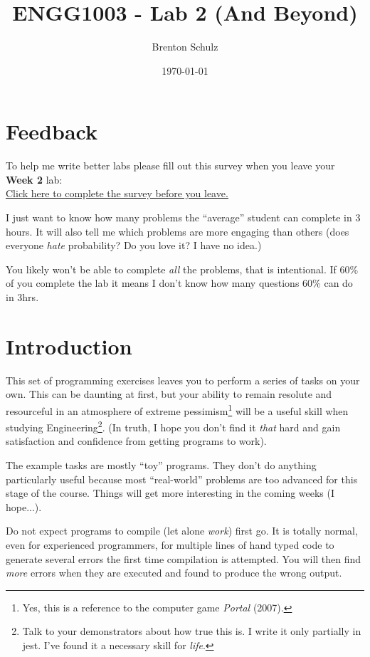 \documentclass{lab}
\title{ENGG1003 - Lab 2 (And Beyond)}
\author{Brenton Schulz}
\date{\today}
\begin{document}
\maketitle

\section{Feedback}

To help me write better labs please fill out this survey when you leave your \textbf{Week 2} lab:
\vspace{5mm} \\ 
\huge{\underline{\href{https://docs.google.com/forms/d/1wUgJlZGRcYm7_ZKBOxzc3DHkZv5UVqKQJ_EGQhSV55Q/}{Click here to complete the survey before you leave.}}}\\
\vspace{2mm}
\normalsize

I just want to know how many problems the ``average'' student can complete in 3 hours. It will also tell me which problems are more engaging than others (does everyone \textit{hate} probability? Do you love it? I have no idea.)

You likely won't be able to complete \textit{all} the problems, that is intentional. If 60\% of you complete the lab it means I don't know how many questions 60\% can do in 3hrs.

\section{Introduction}

This set of programming exercises leaves you to perform a series of tasks on your own. This can be daunting at first, but your ability to remain resolute and resourceful in an atmosphere of extreme pessimism\footnote{Yes, this is a reference to the computer game \textit{Portal} (2007).} will be a useful skill when studying Engineering\footnote{Talk to your demonstrators about how true this is. I write it only partially in jest. I've found it a necessary skill for \textit{life}.}. (In truth, I hope you don't find it \textit{that} hard and gain satisfaction and confidence from getting programs to work).

The example tasks are mostly ``toy'' programs. They don't do anything particularly useful because most ``real-world'' problems are too advanced for this stage of the course. Things will get more interesting in the coming weeks (I hope...).

Do not expect programs to compile (let alone \textit{work}) first go. It is totally normal, even for experienced programmers, for multiple lines of hand typed code to generate several errors the first time compilation is attempted. You will then find \textit{more} errors when they are executed and found to produce the wrong output.
\end{document}
